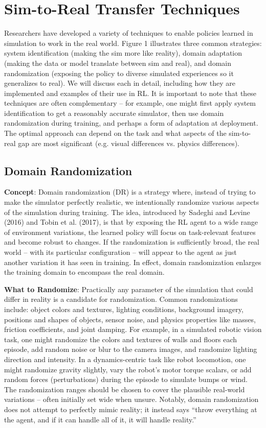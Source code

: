 \section{Sim-to-Real Transfer Techniques}

Researchers have developed a variety of techniques to enable policies learned in simulation to work in the real world. Figure 1 illustrates three common strategies: system identification (making the sim more like reality), domain adaptation (making the data or model translate between sim and real), and domain randomization (exposing the policy to diverse simulated experiences so it generalizes to real). We will discuss each in detail, including how they are implemented and examples of their use in RL. It is important to note that these techniques are often complementary – for example, one might first apply system identification to get a reasonably accurate simulator, then use domain randomization during training, and perhaps a form of adaptation at deployment. The optimal approach can depend on the task and what aspects of the sim-to-real gap are most significant (e.g. visual differences vs. physics differences).

\subsection{Domain Randomization}
\textbf{Concept}: Domain randomization (DR) is a strategy where, instead of trying to make the simulator perfectly realistic, we intentionally randomize various aspects of the simulation during training. The idea, introduced by Sadeghi and Levine (2016) and Tobin et al. (2017), is that by exposing the RL agent to a wide range of environment variations, the learned policy will focus on task-relevant features and become robust to changes. If the randomization is sufficiently broad, the real world – with its particular configuration – will appear to the agent as just another variation it has seen in training. In effect, domain randomization enlarges the training domain to encompass the real domain.

\textbf{What to Randomize}: Practically any parameter of the simulation that could differ in reality is a candidate for randomization. Common randomizations include: object colors and textures, lighting conditions, background imagery, positions and shapes of objects, sensor noise, and physics properties like masses, friction coefficients, and joint damping. For example, in a simulated robotic vision
task, one might randomize the colors and textures of walls and floors each episode, add random noise or blur to the camera images, and randomize lighting direction and intensity. In a dynamics-centric task like robot locomotion, one might randomize gravity slightly, vary the robot’s motor torque scalars, or add random forces (perturbations) during the episode to simulate bumps or wind. The randomization
ranges should be chosen to cover the plausible real-world variations – often initially set wide when unsure. Notably, domain randomization does not attempt to perfectly mimic reality; it instead says “throw everything at the agent, and if it can handle all of it, it will handle reality.”

